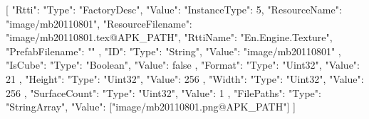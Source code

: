 [{
        "Rtti": {
            "Type": "FactoryDesc",
            "Value": {
                "InstanceType": 5,
                "ResourceName": "image/mb20110801",
                "ResourceFilename": "image/mb20110801.tex@APK_PATH",
                "RttiName": "En.Engine.Texture",
                "PrefabFilename": ""
            }
        },
        "ID": {
            "Type": "String",
            "Value": "image/mb20110801"
        },
        "IsCube": {
            "Type": "Boolean",
            "Value": false
        },
        "Format": {
            "Type": "Uint32",
            "Value": 21
        },
        "Height": {
            "Type": "Uint32",
            "Value": 256
        },
        "Width": {
            "Type": "Uint32",
            "Value": 256
        },
        "SurfaceCount": {
            "Type": "Uint32",
            "Value": 1
        },
        "FilePaths": {
            "Type": "StringArray",
            "Value": ["image/mb20110801.png@APK_PATH"]
        }
    }]